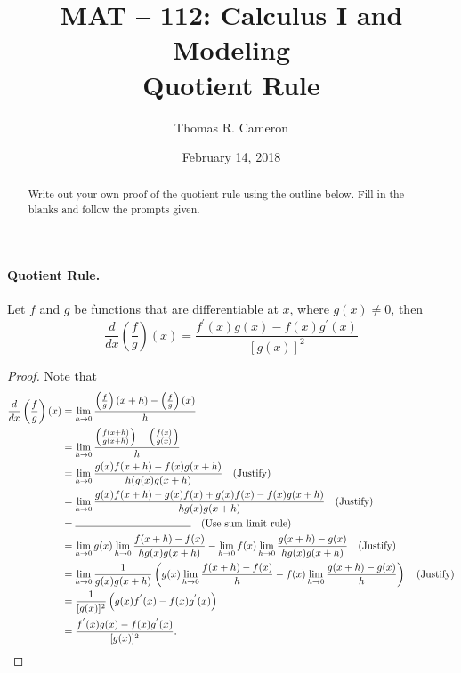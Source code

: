 \documentclass{article}
\title{MAT -- 112: Calculus I and Modeling\\
\large{Quotient Rule}}
\author{Thomas R. Cameron}
\date{February 14, 2018}
\begin{document}
\maketitle

\begin{abstract}
Write out your own proof of the quotient rule using the outline below. Fill in the blanks and follow the prompts given. 
\end{abstract}

\paragraph*{Quotient Rule.} Let $f$ and $g$ be functions that are differentiable at $x$, where $g(x)\neq 0$, then
\[
\frac{d}{dx}\left(\frac{f}{g}\right)(x)=\frac{f^{'}(x)g(x)-f(x)g^{'}(x)}{[g(x)]^{2}}
\]
\begin{proof}
Note that
\begin{align*}
\frac{d}{dx}\left(\frac{f}{g}\right)(x)&=\lim_{h\rightarrow 0}\frac{\left(\frac{f}{g}\right)(x+h)-\left(\frac{f}{g}\right)(x)}{h} \\
&=\lim_{h\rightarrow 0}\frac{\left(\frac{f(x+h)}{g(x+h)}\right)-\left(\frac{f(x)}{g(x)}\right)}{h} \\
&=\lim_{h\rightarrow 0}\frac{g(x)f(x+h)-f(x)g(x+h)}{h(g(x)g(x+h)}\quad\text{(Justify)} \\
&=\lim_{h\rightarrow 0}\frac{g(x)f(x+h)-g(x)f(x)+g(x)f(x)-f(x)g(x+h)}{hg(x)g(x+h)}\quad\text{(Justify)} \\
&=\rule{4cm}{0.15mm}\quad\text{(Use sum limit rule)}\\
&=\lim_{h\rightarrow 0}g(x)\lim_{h\rightarrow 0}\frac{f(x+h)-f(x)}{hg(x)g(x+h)}-\lim_{h\rightarrow 0}f(x)\lim_{h\rightarrow 0}\frac{g(x+h)-g(x)}{hg(x)g(x+h)}\quad\text{(Justify)} \\
&=\lim_{h\rightarrow 0}\frac{1}{g(x)g(x+h)}\left(g(x)\lim_{h\rightarrow 0}\frac{f(x+h)-f(x)}{h}-f(x)\lim_{h\rightarrow 0}\frac{g(x+h)-g(x)}{h}\right)\quad\text{(Justify)} \\
&=\frac{1}{[g(x)]^{2}}\left(g(x)f^{'}(x)-f(x)g^{'}(x)\right) \\
&=\frac{f^{'}(x)g(x)-f(x)g^{'}(x)}{[g(x)]^{2}}.
\end{align*}
\end{proof}
\end{document}
